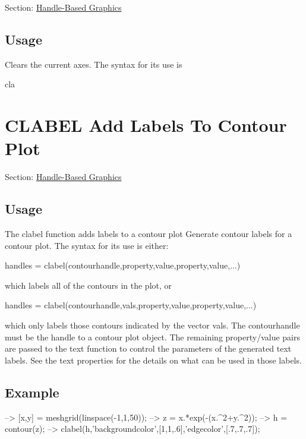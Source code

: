 Section\-: \hyperlink{sec_handle}{Handle-\/\-Based Graphics} \hypertarget{vtkwidgets_vtkxyplotwidget_Usage}{}\subsection{Usage}\label{vtkwidgets_vtkxyplotwidget_Usage}
Clears the current axes. The syntax for its use is \begin{DoxyVerb}  cla
\end{DoxyVerb}
 \hypertarget{handle_clabel}{}\section{C\-L\-A\-B\-E\-L Add Labels To Contour Plot}\label{handle_clabel}
Section\-: \hyperlink{sec_handle}{Handle-\/\-Based Graphics} \hypertarget{vtkwidgets_vtkxyplotwidget_Usage}{}\subsection{Usage}\label{vtkwidgets_vtkxyplotwidget_Usage}
The {\ttfamily clabel} function adds labels to a contour plot Generate contour labels for a contour plot. The syntax for its use is either\-: \begin{DoxyVerb}   handles = clabel(contourhandle,property,value,property,value,...)
\end{DoxyVerb}
 which labels all of the contours in the plot, or \begin{DoxyVerb}   handles = clabel(contourhandle,vals,property,value,property,value,...)
\end{DoxyVerb}
 which only labels those contours indicated by the vector {\ttfamily vals}. The {\ttfamily contourhandle} must be the handle to a contour plot object. The remaining property/value pairs are passed to the {\ttfamily text} function to control the parameters of the generated text labels. See the {\ttfamily text properties} for the details on what can be used in those labels. \hypertarget{variables_struct_Example}{}\subsection{Example}\label{variables_struct_Example}

\begin{DoxyVerbInclude}
--> [x,y] = meshgrid(linspace(-1,1,50));
--> z = x.*exp(-(x.^2+y.^2));
--> h = contour(z);
--> clabel(h,'backgroundcolor',[1,1,.6],'edgecolor',[.7,.7,.7]);
\end{DoxyVerbInclude}


